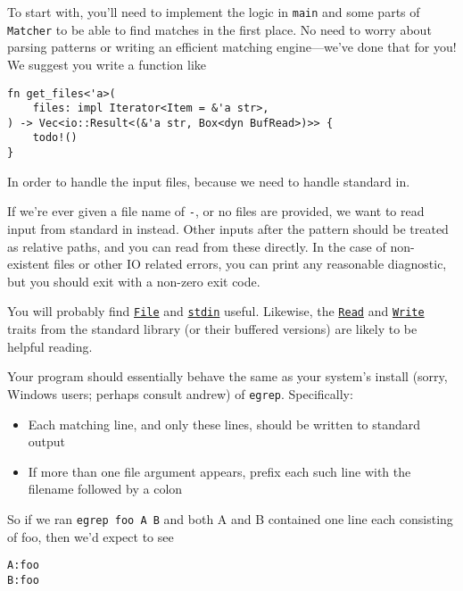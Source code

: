\documentclass{article}
\begin{document}
To start with, you'll need to implement the logic in \texttt{main} and some
parts of \texttt{Matcher} to be able to find matches in the first place. No need
to worry about parsing patterns or writing an efficient matching engine---we've
done that for you! We suggest you write a function like

\begin{verbatim}
fn get_files<'a>(
    files: impl Iterator<Item = &'a str>,
) -> Vec<io::Result<(&'a str, Box<dyn BufRead>)>> {
    todo!()
}
\end{verbatim}

In order to handle the input files, because we need to handle standard in.

If we're ever given a file name of \texttt{-}, or no files are provided, we want
to read input from standard in instead. Other inputs after the pattern should be
treated as relative paths, and you can read from these directly. In the case of
non-existent files or other IO related errors, you can print any reasonable
diagnostic, but you should exit with a non-zero exit code.

You will probably find
\href{https://doc.rust-lang.org/std/fs/struct.File.html}{\texttt{File}} and
\href{https://doc.rust-lang.org/std/io/fn.stdin.html}{\texttt{stdin}} useful.
Likewise, the
\href{https://doc.rust-lang.org/std/io/trait.Read.html}{\texttt{Read}} and
\href{https://doc.rust-lang.org/std/io/trait.Write.html}{\texttt{Write}} traits
from the standard library (or their buffered versions) are likely to be helpful
reading.

Your program should essentially behave the same as your system's install (sorry,
Windows users; perhaps consult andrew) of \texttt{egrep}. Specifically:

\begin{itemize}
    \item Each matching line, and only these lines, should be written to
        standard output
    \item If more than one file argument appears, prefix each such line with the
        filename followed by a colon
\end{itemize}

\clearpage

So if we ran \texttt{egrep foo A B} and both A and B contained one line each
consisting of foo, then we'd expect to see 

\begin{verbatim}
A:foo
B:foo
\end{verbatim}
\end{document}
